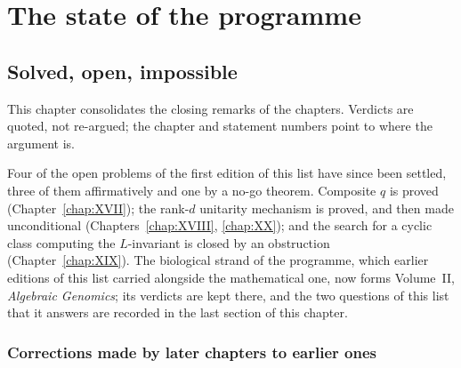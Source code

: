 \part{The state of the programme}
\chapter{Solved, open, impossible}\label{chap:state}

This chapter consolidates the closing remarks of the chapters. Verdicts are quoted, not
re-argued; the chapter and statement numbers point to where the argument is.

Four of the open problems of the first edition of this list have since been settled, three
of them affirmatively and one by a no-go theorem. Composite $q$ is proved
(Chapter~\ref{chap:XVII}); the rank-$d$ unitarity mechanism is proved, and then made
unconditional (Chapters~\ref{chap:XVIII}, \ref{chap:XX}); and the search for a cyclic class
computing the $L$-invariant is closed by an obstruction (Chapter~\ref{chap:XIX}). The
biological strand of the programme, which earlier editions of this list carried alongside
the mathematical one, now forms Volume~II, \emph{Algebraic Genomics}; its verdicts are kept
there, and the two questions of this list that it answers are recorded in the last section
of this chapter.

\section{Corrections made by later chapters to earlier ones}


